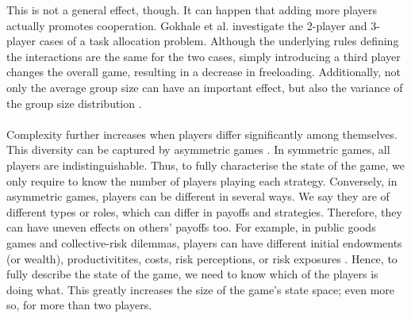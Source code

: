 \documentclass[11pt]{article}
\theoremstyle{plainCl1}
\theoremstyle{plainCl2}
\begin{document}
This is not a general effect, though. It can happen that adding more players actually promotes cooperation. Gokhale et al. \cite{gokhale:JTB:2011} investigate the 2-player and 3-player cases of a task allocation problem. Although the underlying rules defining the interactions are the same for the two cases, simply introducing a third player changes the overall game, resulting in a decrease in freeloading.
Additionally, not only the average group size can have an important effect, but also the variance of the group size distribution \cite{Pena:Evolution:2011, Broom:BMB:2019}.
\\ \\ 
\noindent Complexity further increases when players differ significantly among themselves. This diversity can be captured by asymmetric games \cite{Taylor:JAP:1979, Schuster:AB:1981, Gaunersdorfer:TPB:1991, Hofbauer:JMB:1996, Hofbauer:GEB:2005, Ohtsuki:JTB:2010, McAvoy:PlosCB:2015, Veller:JET:2016, Hauser:Nature:2019}. In symmetric games, all players are indistinguishable. Thus, to fully characterise the state of the game, we only require to know the number of players playing each strategy. Conversely, in asymmetric games, players can be different in several ways. We say they are of different types or roles, which can differ in payoffs and strategies. Therefore, they can have uneven effects on others' payoffs too. For example, in public goods games and collective-risk dilemmas, players can have different initial endowments (or wealth), productivitites, costs, risk perceptions, or risk exposures \cite{Milinski:CC:2011, Vasconcelos:PNAS:2014, Abouchakra:JTB:2014, Hauser:Nature:2019, Merhej:JAIR:2022}. Hence, to fully describe the state of the game, we need to know which of the players is doing what. This greatly increases the size of the game's state space; even more so, for more than two players.  \\ \\ 
\end{document}
